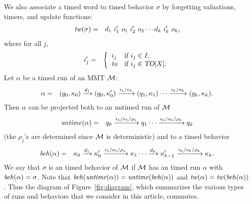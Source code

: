 We also associate a timed word to timed behavior $\sigma$ by forgetting valuations, timers, and update functions:
\begin{eqnarray*}
\mathit{tw}(\sigma) & = & d_ 1 ~ i'_1 ~ o_1 ~ i'_2 ~ o_2 \cdots d_k ~ i'_k ~ o_k, 
\end{eqnarray*} 
where for all  $j$,
\begin{eqnarray*}
i'_j  & = &  \left\{ \begin{array}{ll}
i_j & \mbox{if } i_j \in I,\\
\mathit{to} & \mbox{if } i_j \in \mbox{\sl TO}[X].
\end{array} \right.
\end{eqnarray*}
Let $\alpha$ be a timed run of an MMT ${\mathcal M}$: 
\begin{eqnarray*}
\alpha & = & (q_0, \kappa_0) \xrightarrow{d_1} (q_0, \kappa'_0) \xrightarrow{i_1/o_1} (q_1, \kappa_1)  \cdots
 \xrightarrow{i_k/o_k} (q_k, \kappa_k).
\end{eqnarray*}
Then $\alpha$ can be projected both to an untimed run of ${\mathcal M}$
\begin{eqnarray*}
\mathit{untime} (\alpha) & = & q_0 \xrightarrow{i_1/o_1/\rho_1} q_1  \cdots \xrightarrow{i_k/o_k/\rho_k} q_k
\end{eqnarray*}
(the $\rho_j$'s are determined since ${\mathcal M}$ is deterministic) and to a timed behavior
\begin{eqnarray*}
\mathit{beh}(\alpha) & = & \kappa_0 \xrightarrow{d_1} \kappa'_0 \xrightarrow{i_1/o_1/\rho_1} \kappa_1  \cdots
\xrightarrow{d_k} \kappa'_{k-1} \xrightarrow{i_k/o_k/\rho_k} \kappa_{k}.
\end{eqnarray*}
\iflong
We say that $\sigma$ is an timed behavior of ${\mathcal M}$ if ${\mathcal M}$ has an timed run $\alpha$ with $\mathit{beh}(\alpha) = \sigma$.
\fi
Note that $\mathit{beh}(\mathit{untime}(\alpha))=\mathit{untime}(\mathit{beh}(\alpha))$ and $\mathit{tw}(\alpha) = \mathit{tw}(\mathit{beh}(\alpha))$.
\iflong
Thus the diagram of Figure~\ref{fig:diagram}, which summarizes the various types of runs and behaviors that we consider
in this article, commutes.
